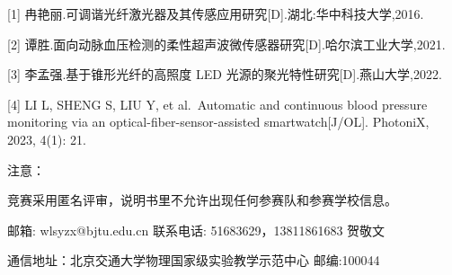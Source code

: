\documentclass[
  10
]{article}
\begin{document}
{[}1{]}
冉艳丽.可调谐光纤激光器及其传感应用研究{[}D{]}.湖北:华中科技大学,2016.

{[}2{]}
谭胜.面向动脉血压检测的柔性超声波微传感器研究{[}D{]}.哈尔滨工业大学,2021.

{[}3{]} 李孟强.基于锥形光纤的高照度 LED
光源的聚光特性研究{[}D{]}.燕山大学,2022.

{[}4{]} LI L, SHENG S, LIU Y, et al.~Automatic and continuous blood
pressure monitoring via an optical-fiber-sensor-assisted
smartwatch{[}J/OL{]}. PhotoniX, 2023, 4(1): 21.

注意：

竞赛采用匿名评审，说明书里不允许出现任何参赛队和参赛学校信息。

邮箱: wlsyzx@bjtu.edu.cn 联系电话: 51683629，13811861683 贺敬文

通信地址：北京交通大学物理国家级实验教学示范中心 邮编:100044
\end{document}

